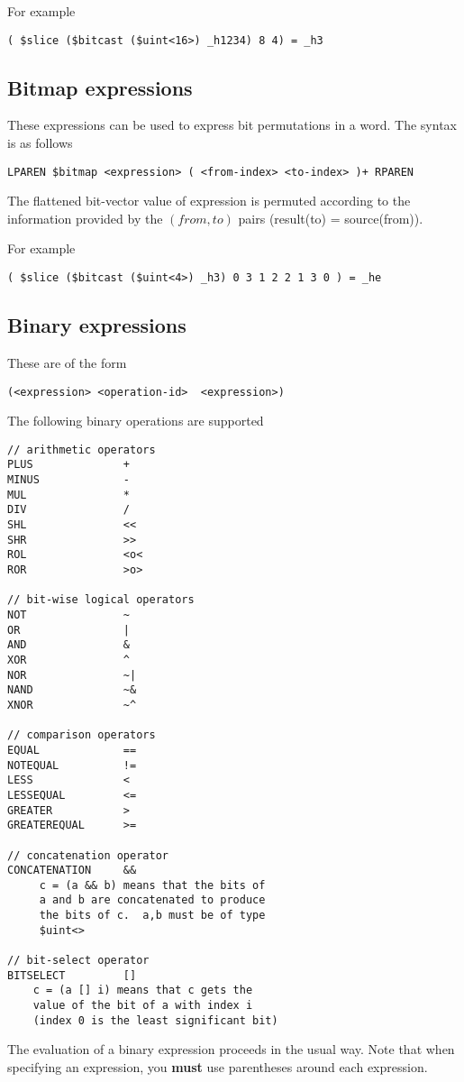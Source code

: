 \documentclass{article}
\begin{document}
For example
\begin{verbatim}
( $slice ($bitcast ($uint<16>) _h1234) 8 4) = _h3
\end{verbatim}

\subsection{Bitmap expressions}

These expressions can be used to express bit permutations
in a word.  The syntax is as follows
\begin{verbatim}
LPAREN $bitmap <expression> ( <from-index> <to-index> )+ RPAREN
\end{verbatim}
The flattened bit-vector value of expression is permuted according
to the information provided by the $(from,to)$ pairs (result(to) = source(from)).

For example
\begin{verbatim}
( $slice ($bitcast ($uint<4>) _h3) 0 3 1 2 2 1 3 0 ) = _he
\end{verbatim}


\subsection{Binary expressions}

These are of the
form
\begin{verbatim}
(<expression> <operation-id>  <expression>)
\end{verbatim}
The following binary operations are supported
\begin{verbatim}
// arithmetic operators
PLUS              + 
MINUS             - 
MUL               * 
DIV               / 
SHL               <<
SHR               >> 
ROL               <o<
ROR               >o> 

// bit-wise logical operators
NOT               ~     
OR                |     
AND               &    
XOR               ^   
NOR               ~|     
NAND              ~&    
XNOR              ~^   

// comparison operators
EQUAL             ==
NOTEQUAL          !=
LESS              < 
LESSEQUAL         <=
GREATER           > 
GREATEREQUAL      >=

// concatenation operator
CONCATENATION     &&
     c = (a && b) means that the bits of
     a and b are concatenated to produce
     the bits of c.  a,b must be of type
     $uint<>

// bit-select operator
BITSELECT         []
    c = (a [] i) means that c gets the
    value of the bit of a with index i 
    (index 0 is the least significant bit)
\end{verbatim}
The evaluation of a binary expression proceeds in
the usual way.  Note that when specifying an 
expression, you {\bf must} use parentheses around
each expression.
\end{document}

